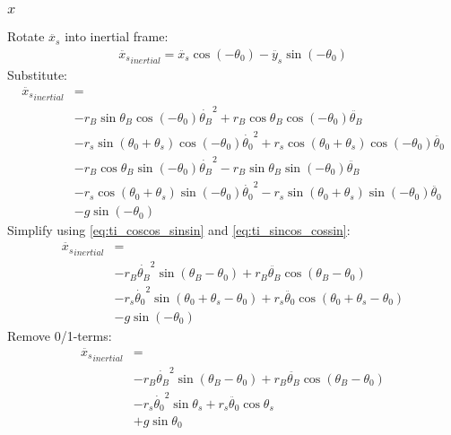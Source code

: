 \documentclass[titlepage]{article}
\numberwithin{equation}{section}
\begin{document}
\subsubsection{$x$}
Rotate $\ddot{x_s}$ into inertial frame:
\begin{align}
\ddot{x_s}_{inertial} = \ddot{x_s} \cos{(-\theta_0)} - \ddot{y_s} \sin{(-\theta_0)}
\end{align}
Substitute:
\begin{align}
\ddot{x_s}_{inertial} &= \nonumber \\
    &- r_B \sin \theta_B \cos{(-\theta_0)} \dot{\theta_B}^2
     + r_B \cos \theta_B \cos{(-\theta_0)} \ddot{\theta_B} \nonumber \\
    &- r_s \sin{(\theta_0 + \theta_s)} \cos{(-\theta_0)} \dot{\theta_0}^2
     + r_s \cos{(\theta_0 + \theta_s)} \cos{(-\theta_0)} \ddot{\theta_0} \nonumber \\
    &- r_B \cos \theta_B \sin{(-\theta_0)} \dot{\theta_B}^2
     - r_B \sin \theta_B \sin{(-\theta_0)} \ddot{\theta_B} \nonumber \\
    &- r_s \cos{(\theta_0 + \theta_s)} \sin{(-\theta_0)} \dot{\theta_0}^2
     - r_s \sin{(\theta_0 + \theta_s)} \sin{(-\theta_0)} \ddot{\theta_0} \nonumber \\
    &- g \sin{(-\theta_0)}
\end{align}
Simplify using \ref{eq:ti_coscos_sinsin} and \ref{eq:ti_sincos_cossin}:
\begin{align}
\ddot{x_s}_{inertial} &= \nonumber \\
    &- r_B \dot{\theta_B}^2 \sin{(\theta_B - \theta_0)}
     + r_B \ddot{\theta_B} \cos{(\theta_B -\theta_0)} \nonumber \\
    &- r_s \dot{\theta_0}^2 \sin{(\theta_0 + \theta_s - \theta_0)}
     + r_s \ddot{\theta_0} \cos{(\theta_0 + \theta_s -\theta_0)} \nonumber \\
    &- g \sin{(-\theta_0)}
\end{align}
Remove 0/1-terms:
\begin{align}
\ddot{x_s}_{inertial} &= \nonumber \\
    &- r_B \dot{\theta_B}^2 \sin{(\theta_B - \theta_0)}
     + r_B \ddot{\theta_B} \cos{(\theta_B -\theta_0)} \nonumber \\
    &- r_s \dot{\theta_0}^2 \sin{\theta_s}
     + r_s \ddot{\theta_0} \cos{\theta_s} \nonumber \\
    &+ g \sin{\theta_0}
\end{align}
\end{document}
